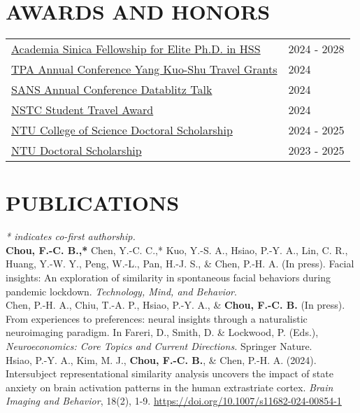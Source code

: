 \documentclass[a4paper,12pt]{article}
\newcommand{\itemspace}{7pt} %
\begin{document}
\section*{AWARDS AND HONORS}
\begin{flushright}
\begin{tabular}{@{}p{}@{}p{}@{}}
\href{https://www.sinica.edu.tw/en/News_Content/56/2728}{Academia Sinica Fellowship for Elite Ph.D. in HSS} & \hfill 2024 - 2028 \\[2pt]
\href{https://www.tpa-tw.org/post/2024travel-grant}{TPA Annual Conference Yang Kuo-Shu Travel Grants} & \hfill 2024\\[2pt]
\href{https://socialaffectiveneuro.org/wp-content/uploads/2024/05/SANS-Conference-2024_Program_Final.pdf}{SANS Annual Conference Datablitz Talk} & \hfill 2024\\[2pt]
\href{https://www.nstc.gov.tw/sci/ch/detail/259f99f5-51ce-4582-8546-9d7caee96871}{NSTC Student Travel Award}  & \hfill 2024\\[2pt]
\href{https://www.science.ntu.edu.tw/file/rule50.pdf}{NTU College of Science Doctoral Scholarship}  & \hfill 2024 - 2025\\[2pt]
\href{https://ord.ntu.edu.tw/w/ordntu/GW_20072012180521920/}{NTU Doctoral Scholarship}  & \hfill 2023 - 2025\\[2pt]
\end{tabular}
\end{flushright}

\section*{PUBLICATIONS}
\textit{* indicates co-first authorship.} \\[10pt]
\noindent\textbf{Chou, F.-C. B.,*} Chen, Y.-C. C.,* Kuo, Y.-S. A., Hsiao, P.-Y. A., Lin, C. R., Huang, Y.-W. Y., Peng, W.-L., Pan, H.-J. S., \& Chen, P.-H. A. (In press). Facial insights: An exploration of similarity in spontaneous facial behaviors during pandemic lockdown. \textit{Technology, Mind, and Behavior}.\\[\itemspace]
\noindent Chen, P.-H. A., Chiu, T.-A. P., Hsiao, P.-Y. A., \& \textbf{Chou, F.-C. B.} (In press). From experiences to preferences: neural insights through a naturalistic neuroimaging paradigm. In Fareri, D., Smith, D. \& Lockwood, P. (Eds.), \textit{Neuroeconomics: Core Topics and Current Directions.} Springer Nature.\\[\itemspace]
\noindent Hsiao, P.-Y. A., Kim, M. J., \textbf{Chou, F.-C. B.}, \& Chen, P.-H. A. (2024). Intersubject representational similarity analysis uncovers the impact of state anxiety on brain activation patterns in the human extrastriate cortex. \textit{Brain Imaging and Behavior}, 18(2), 1-9. \href{https://doi.org/10.1007/s11682-024-00854-1}{https://doi.org/10.1007/s11682-024-00854-1}
\\[\itemspace]
\end{document}
